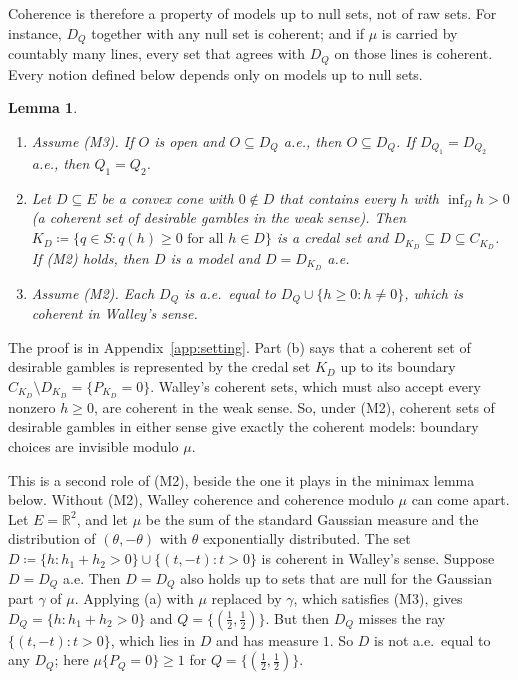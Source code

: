 \documentclass[11pt]{article}
\newcommand{\R}{\mathbb{R}}
\theoremstyle{plain}
\newtheorem{lemma}[theorem]{Lemma}
\theoremstyle{definition}
\theoremstyle{remark}
\begin{document}
Coherence is therefore a property of models up to null sets, not of raw sets. For instance,
$D_Q$ together with any null set is coherent; and if $\mu$ is carried by countably many lines,
every set that agrees with $D_Q$ on those lines is coherent. Every notion defined below
depends only on models up to null sets.

\begin{lemma}\label{lem:identify}
\begin{enumerate}[label=(\alph*)]
  \item Assume (M3). If $O$ is open and $O\subseteq D_Q$ a.e., then $O\subseteq D_Q$. If
  $D_{Q_1}=D_{Q_2}$ a.e., then $Q_1=Q_2$.
  \item Let $D\subseteq E$ be a convex cone with $0\notin D$ that contains every $h$ with
  $\inf_\Omega h>0$ (a coherent set of desirable gambles in the weak sense). Then
  $K_D\coloneqq\{q\in S:q(h)\ge0\text{ for all }h\in D\}$ is a credal set and $D_{K_D}
  \subseteq D\subseteq C_{K_D}$. If (M2) holds, then $D$ is a model and $D=D_{K_D}$ a.e.
  \item Assume (M2). Each $D_Q$ is a.e.\ equal to $D_Q\cup\{h\ge0:h\ne0\}$, which is coherent
  in Walley's sense.
\end{enumerate}
\end{lemma}

The proof is in Appendix~\ref{app:setting}. Part (b) says that a coherent set of desirable
gambles is represented by the credal set $K_D$ up to its boundary $C_{K_D}\setminus D_{K_D}=
\{P_{K_D}=0\}$. Walley's coherent sets, which must also accept every nonzero $h\ge0$, are
coherent in the weak sense. So, under (M2), coherent sets of desirable gambles in either sense
give exactly the coherent models: boundary choices are invisible modulo $\mu$.

This is a second role of (M2), beside the one it plays in the minimax lemma below. Without
(M2), Walley coherence and coherence modulo $\mu$ can come apart. Let $E=\R^2$, and let $\mu$ be
the sum of the standard Gaussian measure and the distribution of $(\theta,-\theta)$ with
$\theta$ exponentially distributed. The set $D\coloneqq\{h:h_1+h_2>0\}\cup\{(t,-t):t>0\}$ is
coherent in Walley's sense. Suppose $D=D_Q$ a.e. Then $D=D_Q$ also holds up to sets that are null
for the Gaussian part $\gamma$ of $\mu$. Applying (a) with $\mu$ replaced by $\gamma$, which
satisfies (M3), gives $D_Q=\{h:h_1+h_2>0\}$ and $Q=\{(\frac12,\frac12)\}$. But then $D_Q$ misses
the ray $\{(t,-t):t>0\}$, which lies in $D$ and has measure $1$. So $D$ is not a.e.\ equal to
any $D_Q$; here $\mu\{P_Q=0\}\ge1$ for $Q=\{(\frac12,\frac12)\}$.
\end{document}
